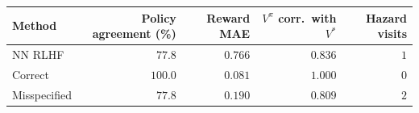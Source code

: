 \begin{tabular}{lrrrr}
\hline
Method & Policy agreement (\%) & Reward MAE & $V^\pi$ corr.\ with $V^*$ & Hazard visits \\
\hline
NN RLHF & $77.8$ & $0.766$ & $0.836$ & $1$ \\
Correct & $100.0$ & $0.081$ & $1.000$ & $0$ \\
Misspecified & $77.8$ & $0.190$ & $0.809$ & $2$ \\
\hline
\end{tabular}
